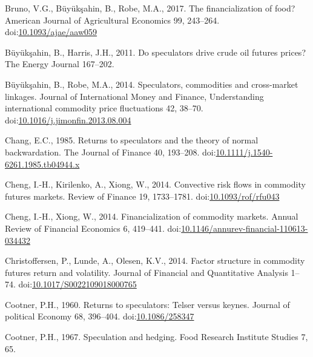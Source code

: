\documentclass[]{elsarticle} %
\begin{document}
\leavevmode\hypertarget{ref-bruno_financialization_2017}{}%
Bruno, V.G., Büyükşahin, B., Robe, M.A., 2017. The financialization of
food? American Journal of Agricultural Economics 99, 243--264.
doi:\href{https://doi.org/10.1093/ajae/aaw059}{10.1093/ajae/aaw059}

\leavevmode\hypertarget{ref-buyuksahin_speculators_2011}{}%
Büyükşahin, B., Harris, J.H., 2011. Do speculators drive crude oil
futures prices? The Energy Journal 167--202.

\leavevmode\hypertarget{ref-buyuksahin_speculators_2014}{}%
Büyükşahin, B., Robe, M.A., 2014. Speculators, commodities and
cross-market linkages. Journal of International Money and Finance,
Understanding international commodity price fluctuations 42, 38--70.
doi:\href{https://doi.org/10.1016/j.jimonfin.2013.08.004}{10.1016/j.jimonfin.2013.08.004}

\leavevmode\hypertarget{ref-chang_returns_1985}{}%
Chang, E.C., 1985. Returns to speculators and the theory of normal
backwardation. The Journal of Finance 40, 193--208.
doi:\href{https://doi.org/10.1111/j.1540-6261.1985.tb04944.x}{10.1111/j.1540-6261.1985.tb04944.x}

\leavevmode\hypertarget{ref-cheng_convective_2014}{}%
Cheng, I.-H., Kirilenko, A., Xiong, W., 2014. Convective risk flows in
commodity futures markets. Review of Finance 19, 1733--1781.
doi:\href{https://doi.org/10.1093/rof/rfu043}{10.1093/rof/rfu043}

\leavevmode\hypertarget{ref-cheng_financialization_2014}{}%
Cheng, I.-H., Xiong, W., 2014. Financialization of commodity markets.
Annual Review of Financial Economics 6, 419--441.
doi:\href{https://doi.org/10.1146/annurev-financial-110613-034432}{10.1146/annurev-financial-110613-034432}

\leavevmode\hypertarget{ref-christoffersen_factor_2014}{}%
Christoffersen, P., Lunde, A., Olesen, K.V., 2014. Factor structure in
commodity futures return and volatility. Journal of Financial and
Quantitative Analysis 1--74.
doi:\href{https://doi.org/10.1017/S0022109018000765}{10.1017/S0022109018000765}

\leavevmode\hypertarget{ref-cootner_returns_1960}{}%
Cootner, P.H., 1960. Returns to speculators: Telser versus keynes.
Journal of political Economy 68, 396--404.
doi:\href{https://doi.org/10.1086/258347}{10.1086/258347}

\leavevmode\hypertarget{ref-cootner_speculation_1967}{}%
Cootner, P.H., 1967. Speculation and hedging. Food Research Institute
Studies 7, 65.
\end{document}
